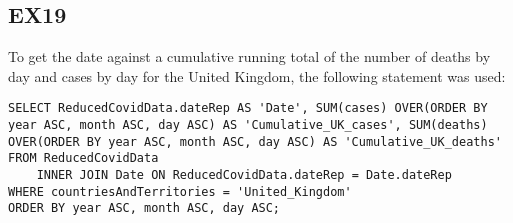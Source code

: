 \documentclass{article}
\begin{document}
\subsection{EX19}

To get the date against a cumulative running total of the number of deaths by day and cases by day for the United Kingdom, the following statement was used:

\begin{lstlisting}[caption={Querying cumulative number of deaths and cases over time for the UK}]
SELECT ReducedCovidData.dateRep AS 'Date', SUM(cases) OVER(ORDER BY year ASC, month ASC, day ASC) AS 'Cumulative_UK_cases', SUM(deaths) OVER(ORDER BY year ASC, month ASC, day ASC) AS 'Cumulative_UK_deaths'
FROM ReducedCovidData
	INNER JOIN Date ON ReducedCovidData.dateRep = Date.dateRep
WHERE countriesAndTerritories = 'United_Kingdom'
ORDER BY year ASC, month ASC, day ASC;
\end{lstlisting}
\end{document}
